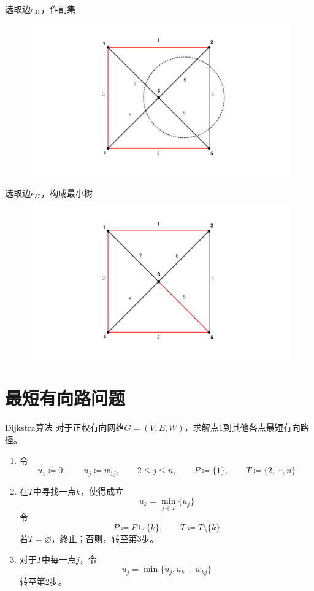 \documentclass[lang = cn, scheme = chinese, thmcnt = section]{elegantbook}
\newcommand{\col}{\coloneqq}
\begin{document}
\begin{solution}
	选取边$e_{45}$，作割集
	\begin{figure}[H]
		\centering
		\includegraphics[scale = 0.15]{../图/12.2.4}
	\end{figure}
	
	选取边$e_{35}$，构成最小树
	\begin{figure}[H]
		\centering
		\includegraphics[scale = 0.15]{../图/12.2.5}
	\end{figure}
\end{solution}

\section{最短有向路问题}

\begin{theorem}{Dijkstra算法}
	对于正权有向网络$G=(V,E,W)$，求解点$1$到其他各点最短有向路径。
	\begin{enumerate}
		\item 令%
		$$
		u_1\col 0,\qquad 
		u_j\col w_{1j},\qquad 
		2\le j \le n,\qquad 
		P\col \{ 1 \},\qquad
		T\col \{ 2,\cdots,n \}
		$$
		\item 在$T$中寻找一点$k$，使得成立%
		$$
		u_k=\min_{j\in T}\{ u_j \}
		$$
		令%
		$$
		P\col P\cup\{ k \},\qquad 
		T\col T\setminus\{ k \}
		$$
		若$T=\varnothing$，终止；否则，转至第3步。
		\item 对于$T$中每一点$j$，令%
		$$
		u_j=\min\{ u_j,u_k+w_{kj} \}
		$$
		转至第2步。
	\end{enumerate}
\end{theorem}
\end{document}
